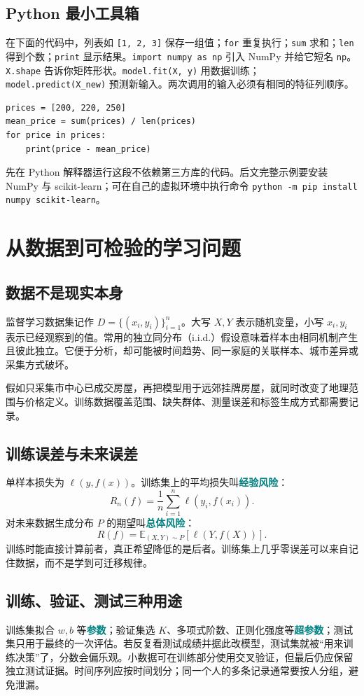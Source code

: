 \documentclass[UTF8,11pt,oneside]{ctexbook}
\newcommand{\key}[1]{\textcolor{teal}{\bfseries #1}}
\newcommand{\E}{\mathbb{E}}
\begin{document}
\section{Python 最小工具箱}
在下面的代码中，列表如 \texttt{[1, 2, 3]} 保存一组值；\texttt{for} 重复执行；\texttt{sum} 求和；\texttt{len} 得到个数；\texttt{print} 显示结果。\texttt{import numpy as np} 引入 NumPy 并给它短名 \texttt{np}。\texttt{X.shape} 告诉你矩阵形状。\texttt{model.fit(X, y)} 用数据训练；\texttt{model.predict(X\_new)} 预测新输入。两次调用的输入必须有相同的特征列顺序。

\begin{lstlisting}
prices = [200, 220, 250]
mean_price = sum(prices) / len(prices)
for price in prices:
    print(price - mean_price)
\end{lstlisting}
先在 Python 解释器运行这段不依赖第三方库的代码。后文完整示例要安装 NumPy 与 scikit-learn；可在自己的虚拟环境中执行命令 \texttt{python -m pip install numpy scikit-learn}。

\chapter{从数据到可检验的学习问题}
\section{数据不是现实本身}
监督学习数据集记作 $D=\{(x_i,y_i)\}_{i=1}^{n}$。大写 $X,Y$ 表示随机变量，小写 $x_i,y_i$ 表示已经观察到的值。常用的独立同分布（i.i.d.）假设意味着样本由相同机制产生且彼此独立。它便于分析，却可能被时间趋势、同一家庭的关联样本、城市差异或采集方式破坏。

假如只采集市中心已成交房屋，再把模型用于远郊挂牌房屋，就同时改变了地理范围与价格定义。训练数据覆盖范围、缺失群体、测量误差和标签生成方式都需要记录。

\section{训练误差与未来误差}
单样本损失为 $\ell(y,f(x))$。训练集上的平均损失叫\key{经验风险}：
\[
\widehat R_n(f)=\frac1n\sum_{i=1}^{n}\ell(y_i,f(x_i)).
\]
对未来数据生成分布 $P$ 的期望叫\key{总体风险}：
\[
R(f)=\E_{(X,Y)\sim P}[\ell(Y,f(X))].
\]
训练时能直接计算前者，真正希望降低的是后者。训练集上几乎零误差可以来自记住数据，而不是学到可迁移规律。

\section{训练、验证、测试三种用途}
训练集拟合 $w,b$ 等\key{参数}；验证集选 $K$、多项式阶数、正则化强度等\key{超参数}；测试集只用于最终的一次评估。若反复看测试成绩并据此改模型，测试集就被“用来训练决策”了，分数会偏乐观。小数据可在训练部分使用交叉验证，但最后仍应保留独立测试证据。时间序列应按时间划分；同一个人的多条记录通常要按人分组，避免泄漏。
\end{document}
